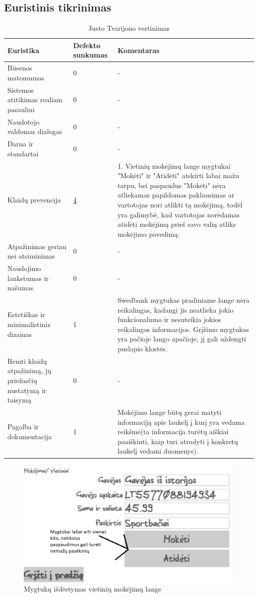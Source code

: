 \documentclass[oneside]{VUMIFPSkursinis}
\begin{document}
\subsection{Euristinis tikrinimas}
\begin{center}
\begin{longtable}[!htb]{|p{3.5cm}|p{1.9cm}|p{9.6cm}|}
	\caption{Justo Tvarijono vertinimas}
	\endfirsthead
	\endhead
  \hline
	Euristika & Defekto sunkumas & Komentaras \\ \hline
	Būsenos matomumas & 0 & - \\ \hline
	Sistemos atitikimas realiam pasauliui & 0 & - \\ \hline
	Naudotojo valdomas dialogas & 0 & - \\ \hline
	Darna ir standartai & 0 & - \\ \hline
	Klaidų prevencija \label{lentele:klaiduPrevencijaM} & \hyperref[fig:klaiduPrevencijaMygtukai2]{4} & 1. Vietinių mokėjimų lange mygtukai "Mokėti" ir "Atidėti" atskirti labai mažu tarpu, bei paspaudus "Mokėti" nėra atliekamas papildomas paklausimas ar vartotojas nori atlikti tą mokėjimą, todėl yra galimybė, kad vartotojas norėdamas atidėti mokėjimą prieš savo valią atliks mokėjimo pavedimą. \\ \hline
	Atpažinimas geriau nei atsiminimas & 0 & - \\ \hline
	Naudojimo lankstumas ir našumas & 0 & - \\ \hline
	Estetiškas ir minimalistiniz dizainas & 1 & Swedbank mygtukas pradiniame lange nėra reikalingas, kadangi jis neatlieka jokio funkcionalumo ir nesuteikia jokios reikalingos informacijos. Grįžimo mygtukas yra pačioje lango apačioje, jį gali uždengti puslapio klostės. \\ \hline
	Remti klaidų atpažinimą, jų priežasčių nustatymą ir taisymą & 0 & - \\ \hline
	Pagalba ir dokumentacija & 1 & Mokėjimo lange būtų gerai matyti informaciją apie laukelį į kurį yra vedama reikšmė(ta informacija turėtų aiškiai paaiškinti, kaip turi atrodyti į konkretų laukelį vedami duomenys). \\ \hline
\end{longtable}
\end{center}
\begin{figure}[H]
	\includegraphics[scale=0.55]{MokejimoPatvirtinimasKlaiduPrevencija2.png}
  \caption{Mygtukų išdėstymas vietinių mokėjimų lange}
	\label{fig:klaiduPrevencijaMygtukai2}
\end{figure}
\end{document}
